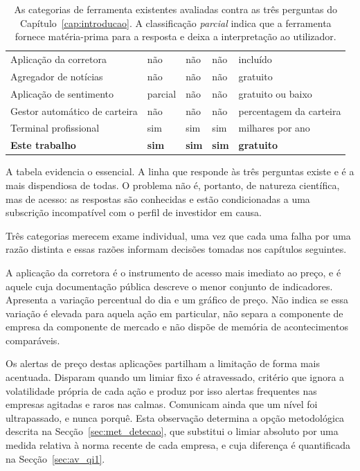\begin{table}[!htbp]
\caption[As ferramentas existentes contra as três perguntas]{As categorias de ferramenta existentes
avaliadas contra as três perguntas do Capítulo~\ref{cap:introducao}. A classificação
\emph{parcial} indica que a ferramenta fornece matéria-prima para a resposta e deixa a
interpretação ao utilizador.}
\label{tab:ctx_ferramentas}
\centering
\small
\begin{tabular}{L{0.22\textwidth} C{0.11\textwidth} C{0.15\textwidth} C{0.12\textwidth}
                L{0.17\textwidth}}
\toprule
{} &  &  &
 &  \\
\midrule
Aplicação da corretora & não & não & não & incluído \\
Agregador de notícias & não & não & não & gratuito \\
Aplicação de sentimento & parcial & não & não & gratuito ou baixo \\
Gestor automático de carteira & não & não & não & percentagem da carteira \\
Terminal profissional & sim & sim & sim & milhares por ano \\
\midrule
\textbf{Este trabalho} & \textbf{sim} & \textbf{sim} & \textbf{sim} & \textbf{gratuito} \\
\bottomrule
\end{tabular}
\end{table}

A tabela evidencia o essencial. A linha que responde às três perguntas existe e é a mais dispendiosa
de todas. O problema não é, portanto, de natureza científica, mas de acesso: as respostas são
conhecidas e estão condicionadas a uma subscrição incompatível com o perfil de investidor em causa.

Três categorias merecem exame individual, uma vez que cada uma falha por uma razão distinta e essas
razões informam decisões tomadas nos capítulos seguintes.

A aplicação da corretora é o instrumento de acesso mais imediato ao preço, e é aquele cuja
documentação pública descreve o menor conjunto de indicadores. Apresenta a variação percentual do
dia e um gráfico de preço. Não indica se essa variação é elevada
para aquela ação em particular, não separa a componente de empresa da componente de mercado e não
dispõe de memória de acontecimentos comparáveis.

Os alertas de preço destas aplicações partilham a limitação de forma mais acentuada. Disparam
quando um limiar fixo é atravessado, critério que ignora a volatilidade própria de cada ação e
produz por isso alertas frequentes nas empresas agitadas e raros nas calmas. Comunicam ainda que um nível foi
ultrapassado, e nunca porquê. Esta observação determina a opção metodológica descrita na
Secção~\ref{sec:met_detecao}, que substitui o limiar absoluto por uma medida relativa à norma
recente de cada empresa, e cuja diferença é quantificada na Secção~\ref{sec:av_qi1}.

